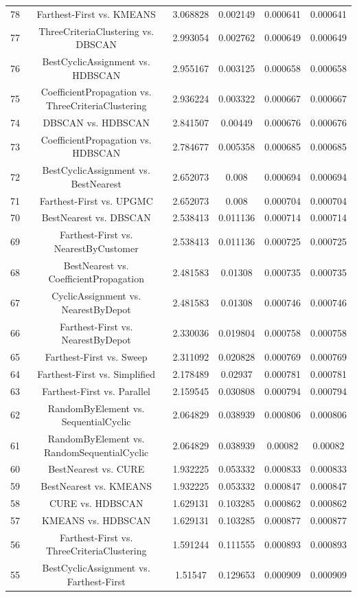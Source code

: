 \documentclass[a4paper,10pt]{article}
\begin{document}
\begin{landscape}
\begin{table}[!htp]
\begin{tabular}{cccccc}
78&Farthest-First vs. KMEANS&3.068828&0.002149&0.000641&0.000641\\
77&ThreeCriteriaClustering vs. DBSCAN&2.993054&0.002762&0.000649&0.000649\\
76&BestCyclicAssignment vs. HDBSCAN&2.955167&0.003125&0.000658&0.000658\\
75&CoefficientPropagation vs. ThreeCriteriaClustering&2.936224&0.003322&0.000667&0.000667\\
74&DBSCAN vs. HDBSCAN&2.841507&0.00449&0.000676&0.000676\\
73&CoefficientPropagation vs. HDBSCAN&2.784677&0.005358&0.000685&0.000685\\
72&BestCyclicAssignment vs. BestNearest&2.652073&0.008&0.000694&0.000694\\
71&Farthest-First vs. UPGMC&2.652073&0.008&0.000704&0.000704\\
70&BestNearest vs. DBSCAN&2.538413&0.011136&0.000714&0.000714\\
69&Farthest-First vs. NearestByCustomer&2.538413&0.011136&0.000725&0.000725\\
68&BestNearest vs. CoefficientPropagation&2.481583&0.01308&0.000735&0.000735\\
67&CyclicAssignment vs. NearestByDepot&2.481583&0.01308&0.000746&0.000746\\
66&Farthest-First vs. NearestByDepot&2.330036&0.019804&0.000758&0.000758\\
65&Farthest-First vs. Sweep&2.311092&0.020828&0.000769&0.000769\\
64&Farthest-First vs. Simplified&2.178489&0.02937&0.000781&0.000781\\
63&Farthest-First vs. Parallel&2.159545&0.030808&0.000794&0.000794\\
62&RandomByElement vs. SequentialCyclic&2.064829&0.038939&0.000806&0.000806\\
61&RandomByElement vs. RandomSequentialCyclic&2.064829&0.038939&0.00082&0.00082\\
60&BestNearest vs. CURE&1.932225&0.053332&0.000833&0.000833\\
59&BestNearest vs. KMEANS&1.932225&0.053332&0.000847&0.000847\\
58&CURE vs. HDBSCAN&1.629131&0.103285&0.000862&0.000862\\
57&KMEANS vs. HDBSCAN&1.629131&0.103285&0.000877&0.000877\\
56&Farthest-First vs. ThreeCriteriaClustering&1.591244&0.111555&0.000893&0.000893\\
55&BestCyclicAssignment vs. Farthest-First&1.51547&0.129653&0.000909&0.000909\\

\end{tabular}
\end{table}
\end{landscape}
\end{document}

